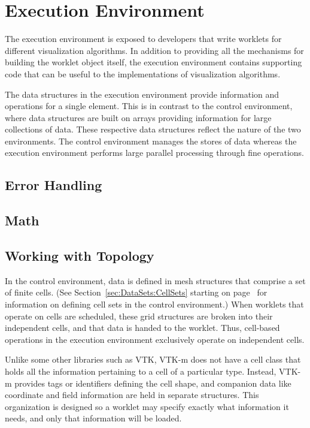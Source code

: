 
\chapter{Execution Environment}
\label{chap:ExecutionEnvironment}

The execution environment is exposed to developers that write worklets for
different visualization algorithms. In addition to providing all the
mechanisms for building the worklet object itself, the execution
environment contains supporting code that can be useful to the
implementations of visualization algorithms.

The data structures in the execution environment provide information and
operations for a single element. This is in contrast to the control
environment, where data structures are built on arrays providing
information for large collections of data. These respective data structures
reflect the nature of the two environments. The control environment manages
the stores of data whereas the execution environment performs large
parallel processing through fine operations.


\section{Error Handling}
\label{sec:ExecutionEnvironment:ErrorHandling}

\section{Math}


\section{Working with Topology}
\label{sec:ExecutionEnvironment:WorkingWithTopology}

In the control environment, data is defined in mesh structures that
comprise a set of finite cells. (See Section~\ref{sec:DataSets:CellSets}
starting on page~\pageref{sec:DataSets:CellSets} for information on
defining cell sets in the control environment.) When worklets that operate
on cells are scheduled, these grid structures are broken into their
independent cells, and that data is handed to the worklet. Thus, cell-based
operations in the execution environment exclusively operate on independent
cells.

Unlike some other libraries such as VTK, VTK-m does not have a cell class
that holds all the information pertaining to a cell of a particular type.
Instead, VTK-m provides tags or identifiers defining the cell shape, and
companion data like coordinate and field information are held in separate
structures. This organization is designed so a worklet may specify exactly
what information it needs, and only that information will be loaded.

